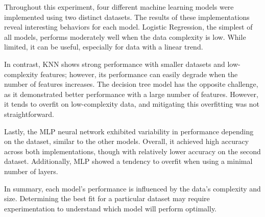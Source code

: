 \documentclass[conference]{IEEEtran}
\begin{document}
Throughout this experiment, four different machine learning models were implemented using two distinct datasets. The results of these implementations reveal interesting behaviors for each model. Logistic Regression, the simplest of all models, performs moderately well when the data complexity is low. While limited, it can be useful, especially for data with a linear trend.

In contrast, KNN shows strong performance with smaller datasets and low-complexity features; however, its performance can easily degrade when the number of features increases. The decision tree model has the opposite challenge, as it demonstrated better performance with a large number of features. However, it tends to overfit on low-complexity data, and mitigating this overfitting was not straightforward.

Lastly, the MLP neural network exhibited variability in performance depending on the dataset, similar to the other models. Overall, it achieved high accuracy across both implementations, though with relatively lower accuracy on the second dataset. Additionally, MLP showed a tendency to overfit when using a minimal number of layers.

In summary, each model’s performance is influenced by the data’s complexity and size. Determining the best fit for a particular dataset may require experimentation to understand which model will perform optimally.



\end{document}
